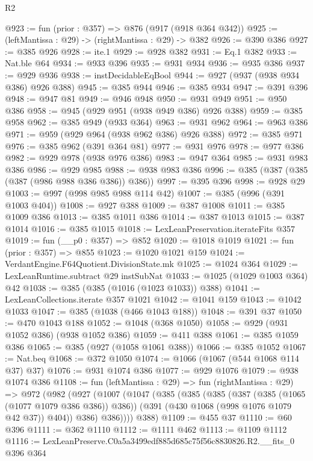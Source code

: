 \begin{lexlean}{R2}
\begin{coremodule}
@923 := fun (prior : @357) => @876 (@917 (@918 @364 @342))
@925 := (leftMantissa : @29) -> (rightMantissa : @29) -> @382
@926 := @390 @386
@927 := @385 @926
@928 := ite.{1}
@929 := @928 @382
@931 := Eq.{1} @382
@933 := Nat.ble @64
@934 := @933 @396
@935 := @931 @934
@936 := @935 @386
@937 := @929 @936
@938 := instDecidableEqBool
@944 := @927 (@937 (@938 @934 @386) @926 @388)
@945 := @385 @944
@946 := @385 @934
@947 := @391 @396
@948 := @947 @81
@949 := @946 @948
@950 := @931 @949
@951 := @950 @386
@958 := @945 (@929 @951 (@938 @949 @386) @926 @388)
@959 := @385 @958
@962 := @385 @949 (@933 @364)
@963 := @931 @962
@964 := @963 @386
@971 := @959 (@929 @964 (@938 @962 @386) @926 @388)
@972 := @385 @971
@976 := @385 @962 (@391 @364 @81)
@977 := @931 @976
@978 := @977 @386
@982 := @929 @978 (@938 @976 @386)
@983 := @947 @364
@985 := @931 @983 @386
@986 := @929 @985
@988 := @938 @983 @386
@996 := @385 (@387 (@385 (@387 (@986 @988 @386 @386)) @386))
@997 := @395 @396
@998 := @928 @29
@1003 := @997 (@998 @985 @988 @114 @42)
@1007 := @385 (@996 (@391 @1003 @404))
@1008 := @927 @388
@1009 := @387 @1008
@1011 := @385 @1009 @386
@1013 := @385 @1011 @386
@1014 := @387 @1013
@1015 := @387 @1014
@1016 := @385 @1015
@1018 := LexLeanPreservation.iterateFits @357
@1019 := fun (__p0 : @357) => @852
@1020 := @1018 @1019
@1021 := fun (prior : @357) => @855
@1023 := @1020 @1021 @159
@1024 := VerdantEngine.F64Quotient.DivisionState.mk
@1025 := @1024 @364
@1029 := LexLeanRuntime.subtract @29 instSubNat
@1033 := @1025 (@1029 @1003 @364) @42
@1038 := @385 (@385 (@1016 (@1023 @1033)) @388)
@1041 := LexLeanCollections.iterate @357 @1021
@1042 := @1041 @159
@1043 := @1042 @1033
@1047 := @385 (@1038 (@466 @1043 @188))
@1048 := @391 @37
@1050 := @470 @1043 @188
@1052 := @1048 (@368 @1050)
@1058 := @929 (@931 @1052 @386) (@938 @1052 @386)
@1059 := @411 @388
@1061 := @385 @1059 @386
@1065 := @385 (@927 (@1058 @1061 @388))
@1066 := @385 @1052
@1067 := Nat.beq
@1068 := @372 @1050
@1074 := @1066 (@1067 (@544 @1068 @114 @37) @37)
@1076 := @931 @1074 @386
@1077 := @929 @1076
@1079 := @938 @1074 @386
@1108 := fun (leftMantissa : @29) =>
  fun (rightMantissa : @29) =>
  @972
    (@982
      (@927
        (@1007
          (@1047
            (@385
              (@385
                (@385
                  (@387 (@385 (@1065 (@1077 @1079 @386 @386)) @386))
                  (@391 (@430 @1068 (@998 @1076 @1079 @42 @37)) @404))
                @386)
              @386))))
      @388)
@1109 := @455 @37
@1110 := @60 @396
@1111 := @362 @1110
@1112 := @1111 @462
@1113 := @1109 @1112
@1116 := LexLeanPreserve.C0a5a3499edf885d685c75f56c8830826.R2.__fits_0 @396 @364

\end{coremodule}
\end{lexlean}
